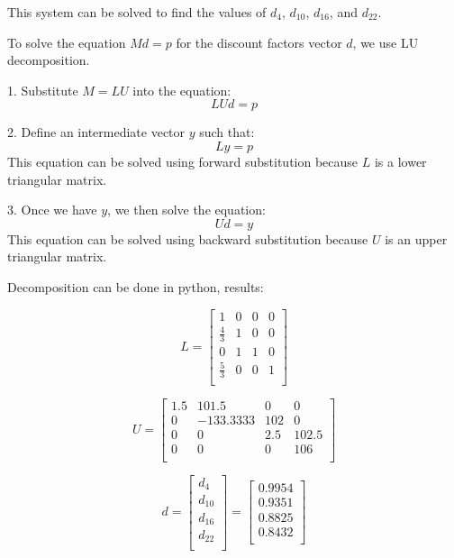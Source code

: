 \documentclass{article}
\begin{document}
This system can be solved to find the values of \( d_4 \), \( d_{10} \), \( d_{16} \), and \( d_{22} \).

To solve the equation \( M d = p \) for the discount factors vector \( d \), we use LU decomposition.

1. Substitute \( M = LU \) into the equation:
\[
    LU d = p
\]

2. Define an intermediate vector \( y \) such that:
\[
    L y = p
\]
This equation can be solved using forward substitution because \( L \) is a lower triangular matrix.

3. Once we have \( y \), we then solve the equation:
\[
    U d = y
\]
This equation can be solved using backward substitution because \( U \) is an upper triangular matrix.

Decomposition can be done in python, results:

\[
    L = \begin{bmatrix}
        1           & 0 & 0 & 0 \\
        \frac{4}{3} & 1 & 0 & 0 \\
        0           & 1 & 1 & 0 \\
        \frac{5}{3} & 0 & 0 & 1 \\
    \end{bmatrix}
\]

\[
    U = \begin{bmatrix}
        1.5 & 101.5     & 0   & 0     \\
        0   & -133.3333 & 102 & 0     \\
        0   & 0         & 2.5 & 102.5 \\
        0   & 0         & 0   & 106   \\
    \end{bmatrix}
\]

\[
    d = \begin{bmatrix}
        d_{4}  \\
        d_{10} \\
        d_{16} \\
        d_{22} \\
    \end{bmatrix} = \begin{bmatrix}
        0.9954 \\
        0.9351 \\
        0.8825 \\
        0.8432 \\
    \end{bmatrix}
\]
\end{document}
